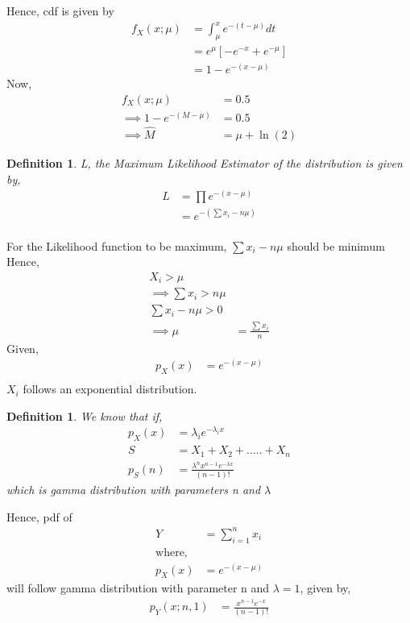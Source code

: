 \documentclass[]{article}
\newtheorem{definition}[problem]{Definition}
\theoremstyle{remark}
\begin{document}
Hence, cdf is given by
\begin{align}
f_X(x; \mu) &= \int_{\mu}^{x} e^{-(t-\mu)}dt\\ 
&= e^{\mu}[-e^{-x} + e^{-\mu}]\\
&= 1 - e^{-(x-\mu)}
\end{align}
Now,
\begin{align}
f_X(x; \mu) &= 0.5\\
\implies 1 - e^{-(M-\mu)} &= 0.5\\
\implies \hat{M} &= \mu + \ln(2)
\label{eq:39}
\end{align}
\begin{definition}
L, the Maximum Likelihood Estimator of the distribution is given by,
\begin{align}
L &= \prod e^{-(x-\mu)}\\
&= e^{-(\sum x_i-n\mu)}\\
\end{align}
\end{definition}
For the Likelihood function to be maximum,
$\sum x_i-n\mu$ should be minimum
Hence,
\begin{align}
X_i > \mu\\
\implies \sum x_i > n\mu\\
\sum x_i-n\mu > 0\\
\implies \mu &= \frac{\sum x_i}{n}
\end{align}
Given,
\begin{align}
p_X(x) &= e^{-(x-\mu)}\\
\end{align}
$X_i$ follows an exponential distribution.
\begin{definition}
We know that if,
\begin{align}
p_X(x) &= \lambda_ie^{-\lambda_ix}\\
S &= X_1 + X_2 +..... +X_n\\
p_S(n) &= \frac{\lambda^nx^{n-1}e^{-\lambda x}}{(n-1)!}
\end{align}
which is gamma distribution with parameters n and $\lambda$
\end{definition}
Hence, pdf of 
\begin{align}
Y &= \sum_{i=1}^{n} x_i\\
\text{where,}\\
p_X(x) &= e^{-(x-\mu)}
\end{align}
will follow gamma distribution with parameter n and $\lambda = 1$, given by,
\begin{align}
p_Y(x;n,1) &= \frac{x^{n-1}e^{-x}}{(n-1)!}
\end{align}
\end{document}
